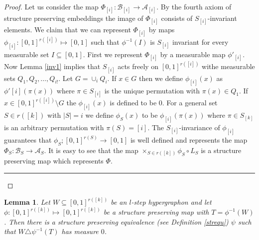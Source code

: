 \documentclass [11pt] {article}
\newcommand{\qed} {\hspace {0.1in} \rule {1.5mm} {3.5mm}}
\newtheorem{lemma}{Lemma}[section]
\def\to{\rightarrow}
\begin{document}
\begin{proof}
Let us consider the map $\Phi_{[i]}: \mathcal{B}_{[i]}\to \mathcal{A}_{[i]}$.
By the fourth axiom of structure preserving embeddings
the image of $\Phi_{[i]}$ consists of $S_{[i]}$-invariant elements.
We claim that we can represent $\Phi_{[i]}$ by maps
$\phi_{[i]}:[0,1]^{r([i])}\mapsto[0,1]$ such that $\phi^{-1}(I)$ is $S_{[i]}$
invariant for every 
measurable set $I\subseteq[0,1]$. First we represent $\Phi_{[i]}$ by a
 measurable map $\phi'_{[i]}$. Now Lemma \ref{inv1} implies that
 $S_{[i]}$ acts freely on $[0,1]^{r([i])}$ withe measurable sets
 $Q_1,Q_2,\dots,Q_{i!}$.
 Let $G=\cup_i Q_i$. If $x\in G$ then we define $\phi_{[i]}(x)$ 
as $\phi'{[i]}(\pi(x))$ where $\pi\in S_{[i]}$ is the unique permutation with
$\pi(x)\in Q_1$. If $x\in [0,1]^{r([i])}\setminus G$ the $\phi_{[i]}(x)$ is 
defined to be $0$. For a general set $S\in r([k])$ with $|S|=i$ 
we define $\phi_S(x)$ to be $\phi_{[i]}(\pi(x))$ where $\pi\in S_{[k]}$ is an
arbitrary permutation with $\pi(S)=[i]$. The $S_{[i]}$-invariance of 
$\phi_{[i]}$ guarantees that $\phi_S;[0,1]^{r(S)}\to [0,1]$ is well defined
and represents the map $\Phi_S:\mathcal{B}_{S}\to \mathcal{A}_{S}$.
It is easy to see that the map $\times_{S\in r([k])}\phi_S\circ L_S$ is a
 structure preserving map which represents $\Phi$. \qed
\end{proof}
\begin{lemma}\label{stepeq} Let $W\subseteq [0,1]^{r([k])}$ be an 
$l$-step hypergraphon and let $\phi:[0,1]^{r([k])}\mapsto[0,1]^{r([k])}$ be a
structure preserving map with $T=\phi^{-1}(W)$. 
Then there is a structure preserving equivalence (see Definition \ref{strequ})
$\psi$ such that $W\triangle\psi^{-1}(T)$ has measure $0$.
\end{lemma}
\end{document}
